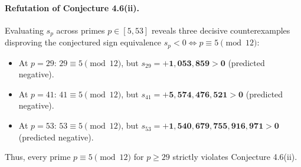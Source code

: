 \documentclass[11pt,a4paper]{article}
\theoremstyle{definition}
\theoremstyle{remark}
\begin{document}
\begin{table}[htbp]
\centering
\caption{Exact cyclotomic CRT reconstruction and divisibility verification for higher odd composites ($n \ge 49$).}
\label{tab:sun_composites}
\end{table}

\paragraph{Refutation of Conjecture 4.6(ii).}
Evaluating $s_p$ across primes $p \in [5, 53]$ reveals three decisive counterexamples disproving the conjectured sign equivalence $s_p < 0 \iff p \equiv 5 \pmod{12}$:
\begin{itemize}
    \item At $p = 29$: $29 \equiv 5 \pmod{12}$, but $s_{29} = \mathbf{+1,053,859 > 0}$ (predicted negative).
    \item At $p = 41$: $41 \equiv 5 \pmod{12}$, but $s_{41} = \mathbf{+5,574,476,521 > 0}$ (predicted negative).
    \item At $p = 53$: $53 \equiv 5 \pmod{12}$, but $s_{53} = \mathbf{+1,540,679,755,916,971 > 0}$ (predicted negative).
\end{itemize}
Thus, every prime $p \equiv 5 \pmod{12}$ for $p \ge 29$ strictly violates Conjecture 4.6(ii).
\end{document}
